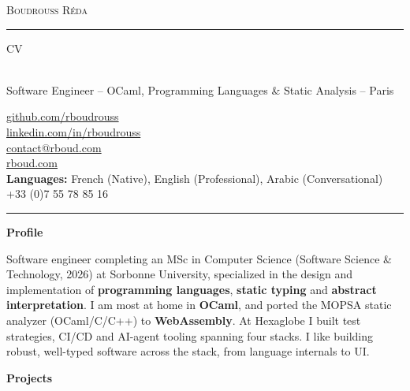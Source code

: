 \documentclass[10pt,A4]{article}
\newcommand{\cvsection}[1]
{
	\begin{center}
		\large\textcolor{sectcol}{\textbf{#1}}
	\end{center}
}
\newcommand{\metasection}[2]
{
\footnotesize{#2} \hspace*{\fill} \footnotesize{#1}\\[1pt]
}
\begin{document}
\pagestyle{fancy}


\vspace{-8pt}
\begin{center}
    {\HUGE \textsc{Boudrouss Réda} \textcolor{sectcol}{\rule[-1mm]{1mm}{0.9cm}} \textsc{CV}}\\[2pt]
    {\small Software Engineer -- OCaml, Programming Languages \& Static Analysis -- Paris}
\end{center}

\vspace{6pt}

\metasection{\href{https://github.com/rboudrouss}{github.com/rboudrouss}}{}
\metasection{\href{https://www.linkedin.com/in/rboudrouss}{linkedin.com/in/rboudrouss}}{}
\metasection{\href{mailto:contact@rboud.com}{contact@rboud.com}}{}
\metasection{\href{https://rboud.com}{rboud.com}}{}
\metasection{+33 (0)7 55 78 85 16}{\textbf{Languages:} French (Native), English (Professional), Arabic (Conversational)}

\vspace{-15pt}
\textcolor{softcol}{\hrule}

\normalsize

\cvsection{Profile}
Software engineer completing an MSc in Computer Science (Software Science \& Technology, 2026) at Sorbonne University, specialized in the design and implementation of \textbf{programming languages}, \textbf{static typing} and \textbf{abstract interpretation}. I am most at home in \textbf{OCaml}, and ported the MOPSA static analyzer (OCaml/C/C++) to \textbf{WebAssembly}. At Hexaglobe I built test strategies, CI/CD and AI-agent tooling spanning four stacks. I like building robust, well-typed software across the stack, from language internals to UI.

\cvsection{Projects}
\end{document}
